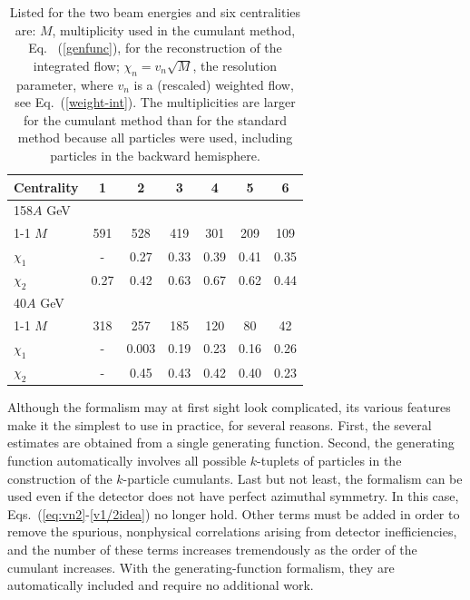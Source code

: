 \documentclass[aps,prc,superscriptaddress,showpacs,floatfix,nofootinbib]{revtex4}
\begin{document}
\begin{table}[hbt!]
\caption{Listed for the two beam energies and six centralities are:
  $M$, multiplicity used in the cumulant method, Eq. \
  (\ref{genfunc}), for the reconstruction of the integrated flow;
  $\chi_n=v_n\sqrt{M}$, the resolution parameter, where $v_n$ is a
  (rescaled) weighted flow, see Eq.\ (\ref{weight-int}). The
  multiplicities are larger for the cumulant method than for the
  standard method because all particles were used, including particles
  in the backward hemisphere.}
\begin{center}
\begin{ruledtabular}
\begin{tabular}{l|c|c|c|c|c|c}
Centrality              & 1    & 2    & 3    & 4    & 5    & 6    \\ \hline
158$A$ GeV              & & & & & & \\ \cline{1-1}
$M$                     & 591  & 528  & 419  & 301  & 209  & 109   \\
$\chi_1$                & -    & 0.27 & 0.33 & 0.39 & 0.41 & 0.35  \\
$\chi_2$                & 0.27 & 0.42 & 0.63 & 0.67 & 0.62 & 0.44  \\ \hline
40$A$ GeV              & & & & & & \\ \cline{1-1}
$M$                     & 318  & 257   & 185  & 120  & 80   & 42   \\
$\chi_1$                & -    & 0.003 & 0.19 & 0.23 & 0.16 & 0.26  \\
$\chi_2$                & -    & 0.45  & 0.43 & 0.42 & 0.40 & 0.23  \\
\end{tabular}
\end{ruledtabular}
\end{center}
\label{tbl:cum}
\end{table}


Although the formalism may at first sight look complicated, its
various features make it the simplest to use in practice, for several
reasons.  First, the several estimates are obtained from a single
generating function. Second, the generating function automatically
involves all possible $k$-tuplets of particles in the construction of
the $k$-particle cumulants.  Last but not least, the formalism can be
used even if the detector does not have perfect azimuthal symmetry. In
this case, Eqs.~(\ref{eq:vn2}-\ref{v1/2idea}) no longer hold.  Other
terms must be added in order to remove the spurious, nonphysical
correlations arising from detector inefficiencies, and the number of
these terms increases tremendously as the order of the cumulant
increases.  With the generating-function formalism, they are
automatically included and require no additional work.
\end{document}

